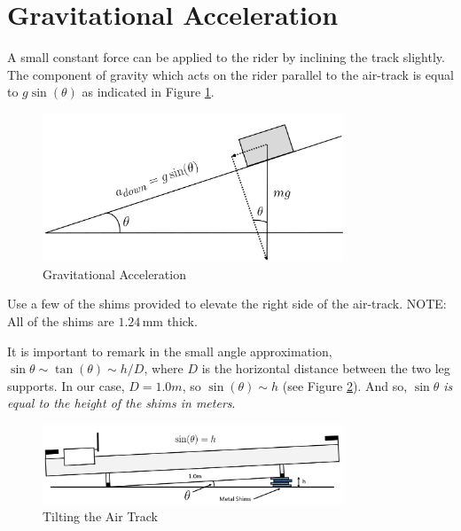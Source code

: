 \section{Gravitational Acceleration}

A small constant force can be applied to the rider by inclining the track slightly.  The component of gravity which acts on the rider parallel to the air-track is equal to $g\sin(\theta)$ as indicated in Figure \ref{fig:slope}.

\begin{figure}[h]
    \begin{center}
        \includegraphics[width=0.8\textwidth]{./Exp1-3/pic/image14.jpg}
    \end{center}
    \caption{Gravitational Acceleration}
    \label{fig:slope}
\end{figure}

Use a few of the shims provided to elevate the right side of the air-track. NOTE: All of the shims are $1.24\,\mathrm{mm}$ thick. \myskip

It is important to remark in the small angle approximation, $\sin\theta \sim \tan(\theta) \sim h/D$, where $D$ is the horizontal distance between the two leg supports. In our case, $D=1.0m$, so $\sin(\theta) \sim h$ (see Figure \ref{fig:shims}). And so, {\it{ $\sin\theta$ is equal to the height of the shims in meters}}.
\begin{figure}[h]
    \begin{center}
        \includegraphics[width=0.8\textwidth]{./Exp1-3/pic/image15.jpg}
    \end{center}
    \caption{Tilting the Air Track}
    \label{fig:shims}
\end{figure}

